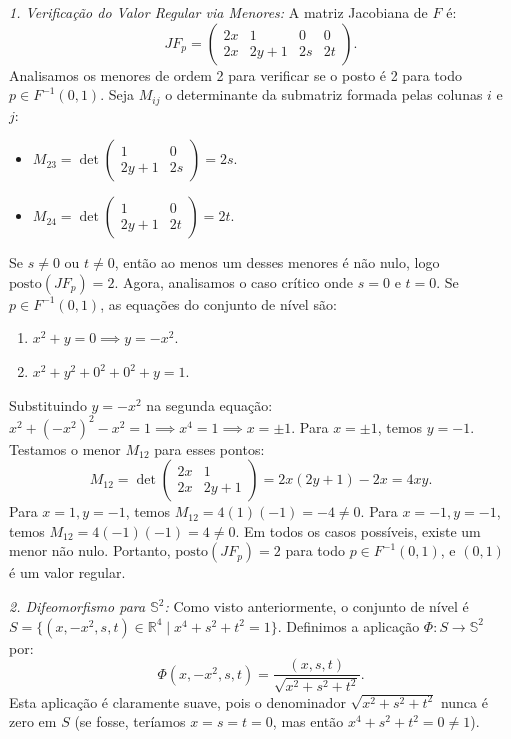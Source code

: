 {	\textit{1. Verificação do Valor Regular via Menores:}
	A matriz Jacobiana de $F$ é:
	\begin{equation*}
		JF_p = \begin{pmatrix} 
			2x & 1 & 0 & 0 \\ 
			2x & 2y+1 & 2s & 2t 
		\end{pmatrix}.
	\end{equation*}
	Analisamos os menores de ordem 2 para verificar se o posto é 2 para todo $p \in F^{-1}(0,1)$.
	Seja $M_{ij}$ o determinante da submatriz formada pelas colunas $i$ e $j$:
	\begin{itemize}
		\item $M_{23} = \det \begin{pmatrix} 1 & 0 \\ 2y+1 & 2s \end{pmatrix} = 2s$.
		\item $M_{24} = \det \begin{pmatrix} 1 & 0 \\ 2y+1 & 2t \end{pmatrix} = 2t$.
	\end{itemize}
	Se $s \neq 0$ ou $t \neq 0$, então ao menos um desses menores é não nulo, logo $\text{posto}(JF_p) = 2$.
	Agora, analisamos o caso crítico onde $s=0$ e $t=0$. Se $p \in F^{-1}(0,1)$, as equações do conjunto de nível são:
	\begin{enumerate}
		\item $x^2 + y = 0 \implies y = -x^2$.
		\item $x^2 + y^2 + 0^2 + 0^2 + y = 1$.
	\end{enumerate}
	Substituindo $y = -x^2$ na segunda equação: $x^2 + (-x^2)^2 - x^2 = 1 \implies x^4 = 1 \implies x = \pm 1$. 
	Para $x = \pm 1$, temos $y = -1$. Testamos o menor $M_{12}$ para esses pontos:
	\begin{equation*}
		M_{12} = \det \begin{pmatrix} 2x & 1 \\ 2x & 2y+1 \end{pmatrix} = 2x(2y+1) - 2x = 4xy.
	\end{equation*}
	Para $x=1, y=-1$, temos $M_{12} = 4(1)(-1) = -4 \neq 0$. Para $x=-1, y=-1$, temos $M_{12} = 4(-1)(-1) = 4 \neq 0$. 
	Em todos os casos possíveis, existe um menor não nulo. Portanto, $\text{posto}(JF_p) = 2$ para todo $p \in F^{-1}(0,1)$, e $(0,1)$ é um valor regular.
	
	\textit{2. Difeomorfismo para $\mathbb{S}^2$:}
	Como visto anteriormente, o conjunto de nível é $S = \{ (x, -x^2, s, t) \in \mathbb{R}^4 \mid x^4 + s^2 + t^2 = 1 \}$.
	Definimos a aplicação $\Phi : S \to \mathbb{S}^2$ por:
	\begin{equation*}
		\Phi(x, -x^2, s, t) = \frac{(x, s, t)}{\sqrt{x^2+s^2+t^2}}.
	\end{equation*}
	Esta aplicação é claramente suave, pois o denominador $\sqrt{x^2+s^2+t^2}$ nunca é zero em $S$ (se fosse, teríamos $x=s=t=0$, mas então $x^4+s^2+t^2=0 \neq 1$).
	
}
